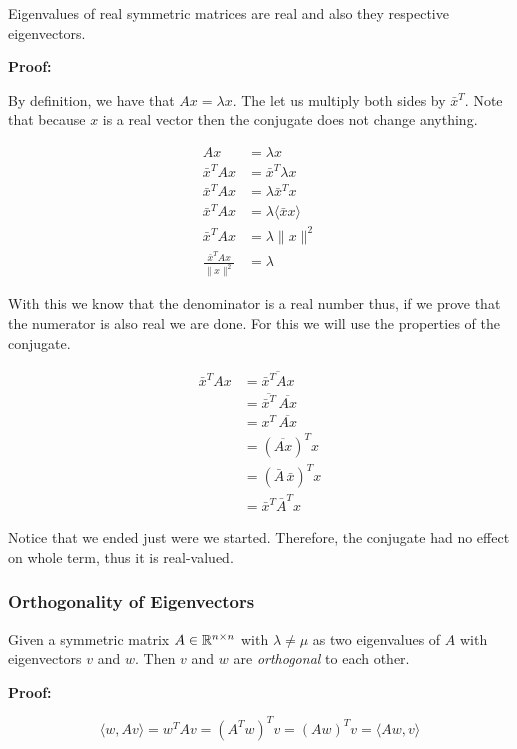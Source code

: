 Eigenvalues of real symmetric matrices are real and also they respective eigenvectors.

\textbf{Proof:}

By definition, we have that \(Ax = \lambda x\). The let us multiply both sides by \( \bar{x}^T\). Note 
that because \(x\) is a real vector then the conjugate does not change anything.

\begin{align*}
    Ax &= \lambda x \\
    \bar{x}^T A x &= \bar{x}^T \lambda x \\
    \bar{x}^T A x &= \lambda \bar{x}^T x \\
    \bar{x}^T A x &= \lambda \langle \bar{x} x \rangle\\
    \bar{x}^T A x &= \lambda \|x\|^2\\
    \frac{\bar{x}^T A x}{\|x\|^2} &= \lambda
\end{align*}

With this we know that the denominator is a real number thus, if we prove that the numerator is also real 
we are done. For this we will use the properties of the conjugate.

\begin{align*}
    \bar{x}^T A x 
    &= \overline{\bar{x}^T A x} \\
    &= \overline{\bar{x}^T} \, \overline{A x} \\
    &= x^T \, \overline{A x} \\
    &= (\overline{A x})^T x \\
    &= (\bar{A} \, \bar{x})^T x \\
    &= \bar{x}^T \bar{A}^T x
\end{align*}

Notice that we ended just were we started. Therefore, the conjugate had no effect on whole term, thus 
it is real-valued.

\QED

\subsubsection{Orthogonality of Eigenvectors}

Given a symmetric matrix \(A \in \mathbb{R}^{n \times n}\) with \(\lambda \ne \mu \) as two eigenvalues of 
\(A\) with eigenvectors \(v\) and \(w\). Then \(v\) and \(w\) are \emph{orthogonal} to each other.

\textbf{Proof:}

\[
    \langle w, Av \rangle = w^{T} Av = (A^T w)^T v = (Aw)^T v = \langle Aw, v\rangle
\]


